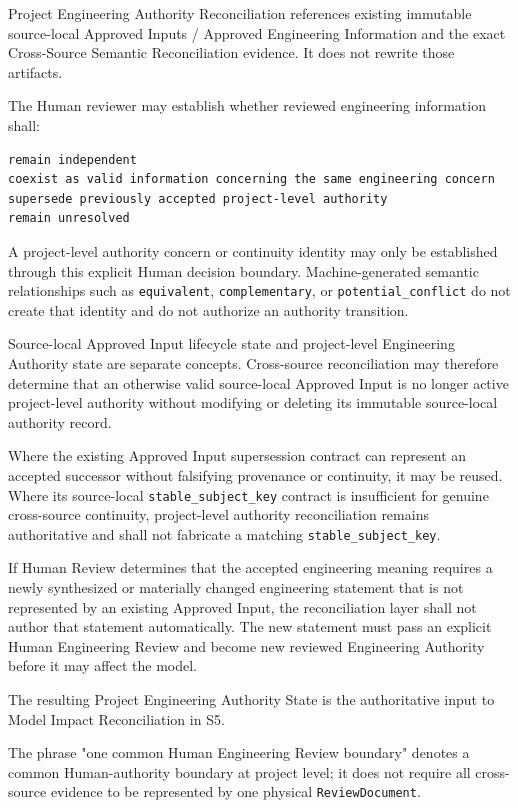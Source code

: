 Project Engineering Authority Reconciliation references existing immutable source-local Approved Inputs / Approved Engineering Information and the exact Cross-Source Semantic Reconciliation evidence. It does not rewrite those artifacts.

The Human reviewer may establish whether reviewed engineering information shall:

\begin{verbatim}
remain independent
coexist as valid information concerning the same engineering concern
supersede previously accepted project-level authority
remain unresolved
\end{verbatim}

A project-level authority concern or continuity identity may only be established through this explicit Human decision boundary. Machine-generated semantic relationships such as \texttt{equivalent}, \texttt{complementary}, or \texttt{potential\_conflict} do not create that identity and do not authorize an authority transition.

Source-local Approved Input lifecycle state and project-level Engineering Authority state are separate concepts. Cross-source reconciliation may therefore determine that an otherwise valid source-local Approved Input is no longer active project-level authority without modifying or deleting its immutable source-local authority record.

Where the existing Approved Input supersession contract can represent an accepted successor without falsifying provenance or continuity, it may be reused. Where its source-local \texttt{stable\_subject\_key} contract is insufficient for genuine cross-source continuity, project-level authority reconciliation remains authoritative and shall not fabricate a matching \texttt{stable\_subject\_key}.

If Human Review determines that the accepted engineering meaning requires a newly synthesized or materially changed engineering statement that is not represented by an existing Approved Input, the reconciliation layer shall not author that statement automatically. The new statement must pass an explicit Human Engineering Review and become new reviewed Engineering Authority before it may affect the model.

The resulting Project Engineering Authority State is the authoritative input to Model Impact Reconciliation in S5.

The phrase "one common Human Engineering Review boundary" denotes a common Human-authority boundary at project level; it does not require all cross-source evidence to be represented by one physical \texttt{ReviewDocument}.

